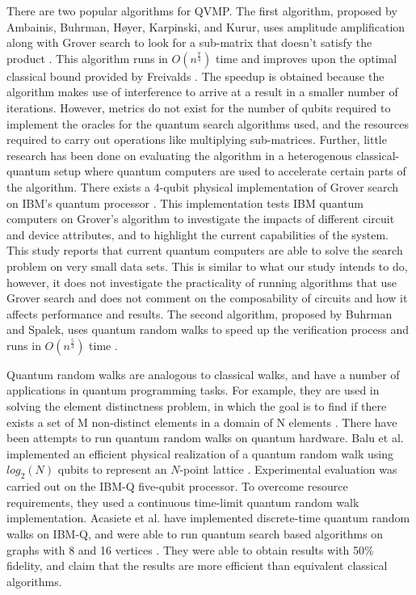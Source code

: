 \documentclass[11pt]{article}
\theoremstyle{definition}
\theoremstyle{remark}
\begin{document}
There are two popular algorithms for QVMP. The first algorithm, proposed by
Ambainis, Buhrman, Høyer, Karpinski, and Kurur, uses amplitude amplification
along with Grover search to look for a sub-matrix that doesn’t satisfy the
product \cite{ambainis2002quantummatrix}. This algorithm runs in
$O(n^{\frac{7}{4}})$ time and improves upon the optimal classical bound provided
by Freivalds \cite{freivalds1979fast}. The speedup is obtained because the
algorithm makes use of interference to arrive at a result in a smaller number of
iterations. However, metrics do not exist for the number of qubits required to
implement the oracles for the quantum search algorithms used, and the resources
required to carry out operations like multiplying sub-matrices.  Further, little
research has been done on evaluating the algorithm in a heterogenous
classical-quantum setup where quantum computers are used to accelerate certain
parts of the algorithm. There exists a 4-qubit physical implementation of Grover
search on IBM’s quantum processor \cite{mandviwalla2018implementing}. This
implementation tests IBM quantum computers on Grover’s algorithm to investigate
the impacts of different circuit and device attributes, and to highlight the
current capabilities of the system.  This study reports that current quantum
computers are able to solve the search problem on very small data sets. This is
similar to what our study intends to do, however, it does not investigate the
practicality of running algorithms that use Grover search and does not comment
on the composability of circuits and how it affects performance and results. The
second algorithm, proposed by Buhrman and Spalek, uses quantum random walks to
speed up the verification process and runs in $O(n^\frac{5}{3})$ time
\cite{buhrman2005quantum}.

Quantum random walks are analogous to classical walks, and have a number of
applications in quantum programming tasks. For example, they are used in solving
the element distinctness problem, in which the goal is to find if there exists a
set of M non-distinct elements in a domain of N elements
\cite{ambainis2007quantumwalk}. There have been attempts to run quantum random
walks on quantum hardware. Balu et al.  implemented an efficient physical
realization of a quantum random walk using $log_2(N)$ qubits to represent an
$N$-point lattice \cite{balu2018physical}.  Experimental evaluation was
carried out on the IBM-Q five-qubit processor. To overcome resource
requirements, they used a continuous time-limit quantum random walk
implementation. Acasiete et al. have implemented discrete-time quantum random
walks on IBM-Q, and were able to run quantum search based algorithms on graphs
with 8 and 16 vertices \cite{acasiete2020implementation}. They were able to
obtain results with 50\% fidelity, and claim that the results are more efficient
than equivalent classical algorithms.
\end{document}
